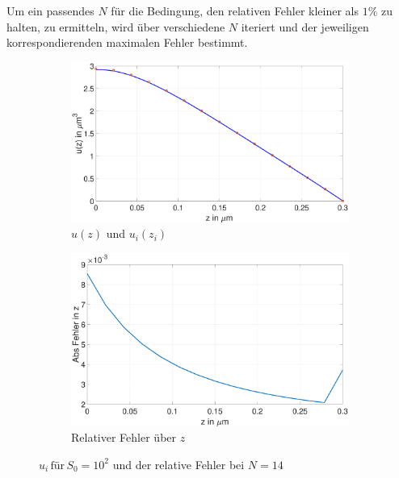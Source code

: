Um ein passendes $N$ für die Bedingung, den relativen Fehler kleiner als $1\%$ zu halten, zu ermitteln, wird über verschiedene $N$ iteriert und der jeweiligen korrespondierenden maximalen Fehler bestimmt.
\begin{figure}[h]
		\begin{subfigure}[b]{0.5\textwidth}
		\includegraphics[width=\textwidth]{figures/station_gl_2_1/S0}
		\caption{$u(z)$ und $u_{i}(z_i)$}
	\end{subfigure}
	\hfill
	\begin{subfigure}[b]{0.5\textwidth}
		\includegraphics[width=1\linewidth]{figures/station_gl_2_1/S0_fehler}
		\caption{Relativer Fehler über $z$}
	\end{subfigure}
	\caption{$u_i \,\text{für} \, S_0=10^2$ und der relative Fehler bei $N=14$ }
\end{figure}

